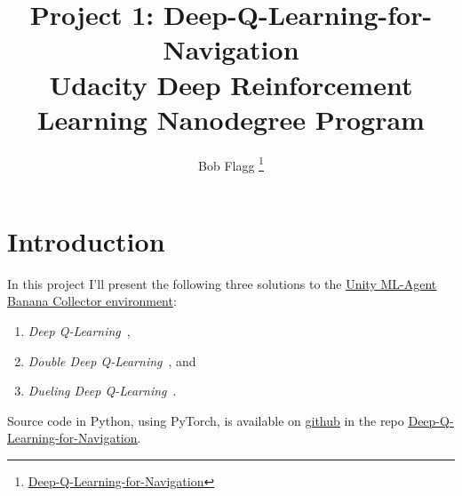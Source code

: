 \documentclass[tog]{acmsiggraph}
\title{
    Project 1: Deep-Q-Learning-for-Navigation\\
    {\large Udacity Deep Reinforcement Learning Nanodegree Program}
}
\author{
    Bob Flagg
    \thanks{
        \href{
            http://github.com/bobflagg/Deep-Q-Learning-for-Navigation}{\underline{Deep-Q-Learning-for-Navigation}}
    }
}
\begin{document}


\maketitle


\keywordlist


\section{Introduction}

In this project I'll present the following three solutions to the  
\href{http://github.com/Unity-Technologies/ml-agents/blob/master/docs/Learning-Environment-Examples.md#banana-collector}{\underline{Unity ML-Agent Banana Collector environment}}:
\begin{enumerate}
	\item {\em Deep Q-Learning}~\cite{DBLP:journals/nature/MnihKSRVBGRFOPB15},
	\item {\em Double Deep Q-Learning}~\cite{DBLP:journals/corr/HasseltGS15}, and
	\item {\em Dueling Deep Q-Learning}~\cite{DBLP:journals/corr/WangFL15}. 
\end{enumerate}
Source code in Python, using PyTorch, is available on 
\href{http://github.com}{\underline{github}} 
in the repo 
\href{http://github.com/bobflagg/Deep-Q-Learning-for-Navigation}{\underline{Deep-Q-Learning-for-Navigation}}.
\end{document}
